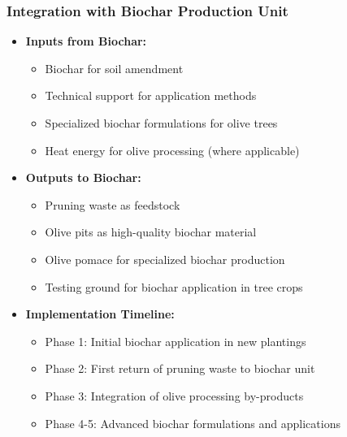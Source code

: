 \subsubsection{Integration with Biochar Production Unit}
\begin{itemize}
    \item \textbf{Inputs from Biochar:}
    \begin{itemize}
        \item Biochar for soil amendment
        \item Technical support for application methods
        \item Specialized biochar formulations for olive trees
        \item Heat energy for olive processing (where applicable)
    \end{itemize}
    
    \item \textbf{Outputs to Biochar:}
    \begin{itemize}
        \item Pruning waste as feedstock
        \item Olive pits as high-quality biochar material
        \item Olive pomace for specialized biochar production
        \item Testing ground for biochar application in tree crops
    \end{itemize}
    
    \item \textbf{Implementation Timeline:}
    \begin{itemize}
        \item Phase 1: Initial biochar application in new plantings
        \item Phase 2: First return of pruning waste to biochar unit
        \item Phase 3: Integration of olive processing by-products
        \item Phase 4-5: Advanced biochar formulations and applications
    \end{itemize}
\end{itemize}

